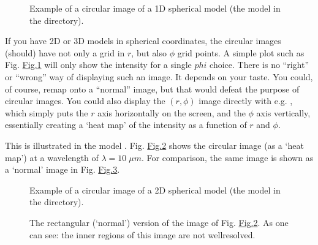 \documentclass[letterpaper,10pt,english]{sphinxmanual}
\begin{document}
\begin{figure}[htbp]
\centering
\capstart

\noindent{}
\caption{Example of a circular image of a 1\sphinxhyphen{}D spherical model (the model in the
 directory).}\label{\detokenize{imagesspectra:id12}}\label{\detokenize{imagesspectra:fig-circ-image}}\end{figure}

If you have 2\sphinxhyphen{}D or 3\sphinxhyphen{}D models in spherical coordinates, the circular images
(should) have not only a grid in \(r\), but also \(\phi\) grid points.
A simple plot such as Fig. \hyperref[\detokenize{imagesspectra:fig-circ-image}]{Fig.\@ \ref{\detokenize{imagesspectra:fig-circ-image}}} will only show the intensity
for a single \(phi\) choice. There is no “right” or “wrong” way of displaying
such an image. It depends on your taste. You could, of course, remap onto a
“normal” image, but that would defeat the purpose of circular images. You could
also display the \((r,\phi)\) image directly with e.g. ,
which simply puts the \(r\) axis horizontally on the screen, and the
\(\phi\) axis vertically, essentially creating a ‘heat map’ of the
intensity as a function of \(r\) and \(\phi\).

This is illustrated in the model .
Fig. \hyperref[\detokenize{imagesspectra:fig-circ-image-2d}]{Fig.\@ \ref{\detokenize{imagesspectra:fig-circ-image-2d}}} shows the circular image (as a ‘heat map’)
at a wavelength of \(\lambda=10\;\mu m\). For comparison, the same image
is shown as a ‘normal’ image in Fig. \hyperref[\detokenize{imagesspectra:fig-rect-circ-image-2d}]{Fig.\@ \ref{\detokenize{imagesspectra:fig-rect-circ-image-2d}}}.

\begin{figure}[htbp]
\centering
\capstart

\noindent{}
\caption{Example of a circular image of a 2\sphinxhyphen{}D spherical model (the model in the
 directory).}\label{\detokenize{imagesspectra:id13}}\label{\detokenize{imagesspectra:fig-circ-image-2d}}\end{figure}

\begin{figure}[htbp]
\centering
\capstart

\noindent{}
\caption{The rectangular (‘normal’) version of the image of Fig. \hyperref[\detokenize{imagesspectra:fig-circ-image-2d}]{Fig.\@ \ref{\detokenize{imagesspectra:fig-circ-image-2d}}}.
As one can see: the inner regions of this image are not well\sphinxhyphen{}resolved.}\label{\detokenize{imagesspectra:id14}}\label{\detokenize{imagesspectra:fig-rect-circ-image-2d}}\end{figure}
\end{document}
